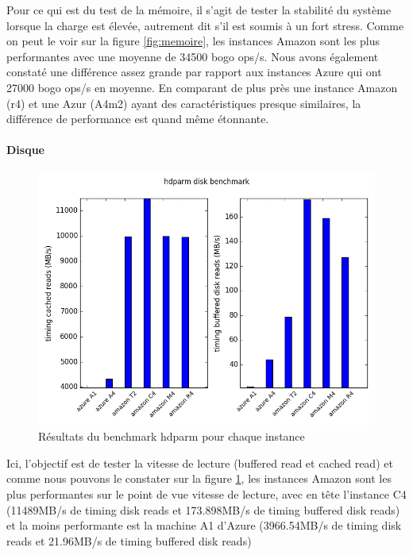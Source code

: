 Pour ce qui est du test de la mémoire, il s’agit de tester la stabilité du système lorsque la charge est élevée, autrement dit s’il est soumis à un fort stress. Comme on peut le voir sur la figure \ref{fig:memoire}, les instances Amazon sont les plus performantes avec une moyenne de 34500 bogo ops/s. Nous avons également constaté une différence assez grande par rapport aux instances Azure qui ont 27000 bogo ops/s en moyenne. En comparant de plus près une instance Amazon (r4) et une Azur (A4m2) ayant des caractéristiques presque similaires, la différence de performance est quand même étonnante. 

\paragraph{Disque}

\begin{figure}[h]
  \begin{center}
    \includegraphics[width=\textwidth]{plot_disk.png}
    \caption{Résultats du benchmark hdparm pour chaque instance}
    \label{fig:disque}
  \end{center}
\end{figure}

Ici, l’objectif est de tester la vitesse de lecture (buffered read et cached read) et comme nous pouvons le constater sur la figure \ref{fig:disque}, les instances Amazon sont les plus performantes sur le point de vue vitesse de lecture, avec en tête l’instance C4 (11489MB/s de timing disk reads et 173.898MB/s de timing buffered disk reads) et la moins performante est la machine A1 d’Azure (3966.54MB/s de timing disk reads  et 21.96MB/s de timing buffered disk reads)

